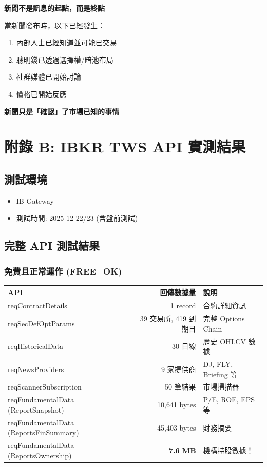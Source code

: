 \documentclass[11pt,a4paper]{article}
\begin{document}
\begin{tcolorbox}[colback=warningyellow!10,colframe=warningyellow]
\textbf{新聞不是訊息的起點，而是終點}

當新聞發布時，以下已經發生：
\begin{enumerate}
    \item 內部人士已經知道並可能已交易
    \item 聰明錢已透過選擇權/暗池布局
    \item 社群媒體已開始討論
    \item 價格已開始反應
\end{enumerate}
\textbf{新聞只是「確認」了市場已知的事情}
\end{tcolorbox}

\newpage
\section*{附錄 B: IBKR TWS API 實測結果}

\subsection*{測試環境}
\begin{itemize}
    \item IB Gateway
    \item 測試時間: 2025-12-22/23 (含盤前測試)
\end{itemize}

\subsection*{完整 API 測試結果}

\subsubsection*{免費且正常運作 (FREE\_OK)}

\begin{table}[H]
\centering
\begin{tabular}{@{}lrl@{}}
\toprule
\textbf{API} & \textbf{回傳數據量} & \textbf{說明} \\
\midrule
reqContractDetails & 1 record & 合約詳細資訊 \\
reqSecDefOptParams & 39 交易所, 419 到期日 & 完整 Options Chain \\
reqHistoricalData & 30 日線 & 歷史 OHLCV 數據 \\
reqNewsProviders & 9 家提供商 & DJ, FLY, Briefing 等 \\
reqScannerSubscription & 50 筆結果 & 市場掃描器 \\
reqFundamentalData (ReportSnapshot) & 10,641 bytes & P/E, ROE, EPS 等 \\
reqFundamentalData (ReportsFinSummary) & 45,403 bytes & 財務摘要 \\
reqFundamentalData (ReportsOwnership) & \textbf{7.6 MB} & 機構持股數據！ \\
\bottomrule
\end{tabular}
\end{table}
\end{document}
